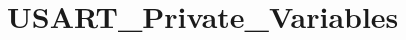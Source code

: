 \hypertarget{group___u_s_a_r_t___private___variables}{}\section{U\+S\+A\+R\+T\+\_\+\+Private\+\_\+\+Variables}
\label{group___u_s_a_r_t___private___variables}
